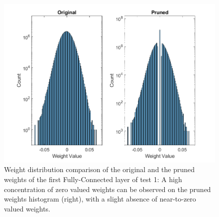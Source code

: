 \begin{figure} [H]
	\centering
	\includegraphics[width=\textwidth]{Images/Weights-distributions/pruned/37.97/weight-distribution-FC1.png}
	\decoRule
	\caption[Weight distribution comparison of the original and the pruned weights of the first Fully-Connected layer of test 1]{Weight distribution comparison of the original and the pruned weights of the first Fully-Connected layer of test 1: A high concentration of zero valued weights can be observed on the pruned weights histogram (right), with a slight absence of near-to-zero valued weights.}
	\label{fig:weight-distribution-comparison-pruned-FC1-test1}
\end{figure}
